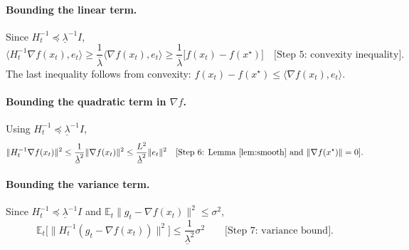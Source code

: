 \documentclass{article}
\newcommand{\E}{\mathbb{E}}
\begin{document}
\paragraph{Bounding the linear term.}
Since $H_{t}^{-1}\preceq \underline{\lambda}^{-1}I$,
\[
\langle H_{t}^{-1}\nabla f(x_{t}),e_{t}\rangle
\ge \frac{1}{\overline{\lambda}}\langle \nabla f(x_{t}),e_{t}\rangle
\ge \frac{1}{\overline{\lambda}}\bigl[f(x_{t})-f(x^{\star})\bigr]
\quad\text{[Step 5: convexity inequality]}.
\]
The last inequality follows from convexity:
$f(x_{t})-f(x^{\star})\le\langle\nabla f(x_{t}),e_{t}\rangle$.

\paragraph{Bounding the quadratic term in $\nabla f$.}
Using $H_{t}^{-1}\preceq \underline{\lambda}^{-1}I$,
\[
\|H_{t}^{-1}\nabla f(x_{t})\|^{2}
\le \frac{1}{\underline{\lambda}^{2}}\|\nabla f(x_{t})\|^{2}
\le \frac{L^{2}}{\underline{\lambda}^{2}}\|e_{t}\|^{2}
\quad\text{[Step 6: Lemma~\ref{lem:smooth} and $\|\nabla f(x^{\star})\|=0$]}.
\]

\paragraph{Bounding the variance term.}
Since $H_{t}^{-1}\preceq \underline{\lambda}^{-1}I$ and $\E_{t}\|g_{t}-\nabla f(x_{t})\|^{2}\le\sigma^{2}$,
\[
\E_{t}\!\big[\|H_{t}^{-1}(g_{t}-\nabla f(x_{t}))\|^{2}\big]
\le \frac{1}{\underline{\lambda}^{2}}\sigma^{2}
\qquad\text{[Step 7: variance bound].}
\]
\end{document}
